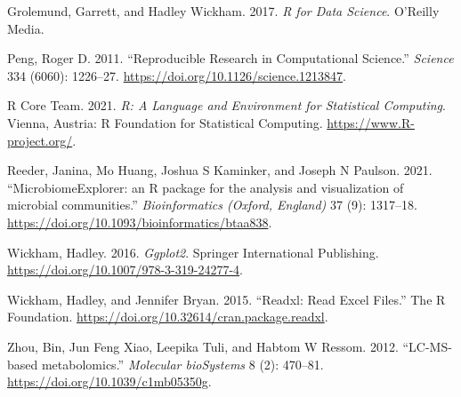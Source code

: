 \documentclass[
  letterpaper,
  DIV=11,
  numbers=noendperiod]{scrreprt}
\newlength{\cslhangindent}
\newenvironment{CSLReferences}[2] %
 {\begin{list}{}{%
  \setlength{\itemindent}{0pt}
  \setlength{\leftmargin}{0pt}
  \setlength{\parsep}{0pt}
  \ifodd #1
   \setlength{\leftmargin}{\cslhangindent}
   \setlength{\itemindent}{-1\cslhangindent}
  \fi
  \setlength{\itemsep}{#2\baselineskip}}}
 {\end{list}}
\begin{document}
\label{refs}
\begin{CSLReferences}{1}{0}
Grolemund, Garrett, and Hadley Wickham. 2017. \emph{R for Data Science}.
O'Reilly Media.

Peng, Roger D. 2011. {``Reproducible Research in Computational
Science.''} \emph{Science} 334 (6060): 1226--27.
\url{https://doi.org/10.1126/science.1213847}.

R Core Team. 2021. \emph{R: A Language and Environment for Statistical
Computing}. Vienna, Austria: R Foundation for Statistical Computing.
\url{https://www.R-project.org/}.

Reeder, Janina, Mo Huang, Joshua S Kaminker, and Joseph N Paulson. 2021.
{``{MicrobiomeExplorer: an R package for the analysis and visualization
of microbial communities.}''} \emph{Bioinformatics (Oxford, England)} 37
(9): 1317--18. \url{https://doi.org/10.1093/bioinformatics/btaa838}.

Wickham, Hadley. 2016. \emph{Ggplot2}. Springer International
Publishing. \url{https://doi.org/10.1007/978-3-319-24277-4}.

Wickham, Hadley, and Jennifer Bryan. 2015. {``Readxl: Read Excel
Files.''} The R Foundation.
\url{https://doi.org/10.32614/cran.package.readxl}.

Zhou, Bin, Jun Feng Xiao, Leepika Tuli, and Habtom W Ressom. 2012.
{``{LC-MS-based metabolomics.}''} \emph{Molecular bioSystems} 8 (2):
470--81. \url{https://doi.org/10.1039/c1mb05350g}.

\end{CSLReferences}
\end{document}
